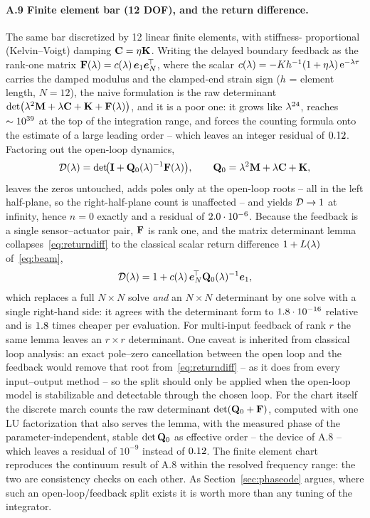 \paragraph{A.9 Finite element bar (12 DOF), and the return difference.}
The same bar discretized by 12 linear finite elements, with stiffness-
proportional (Kelvin--Voigt) damping $\mathbf{C}=\eta\mathbf{K}$. Writing the delayed
boundary feedback as the rank-one matrix
$\mathbf{F}(\lambda)=c(\lambda)\,\boldsymbol{e}_{1}\boldsymbol{e}_{N}^{\!\top}$, where the scalar
$c(\lambda)=-K h^{-1}(1+\eta\lambda)\,\mathrm{e}^{-\lambda\tau}$ carries the damped modulus
and the clamped-end strain sign ($h$ = element length, $N=12$), the naive
formulation is the raw determinant
$\det\bigl(\lambda^2\mathbf{M}+\lambda\mathbf{C}+\mathbf{K}+\mathbf{F}(\lambda)\bigr)$, and it is a
poor one: it grows like $\lambda^{24}$, reaches $\sim10^{39}$ at the top of
the integration range, and forces the counting formula onto the estimate of a
large leading order -- which leaves an integer residual of $0.12$.
Factoring out the open-loop dynamics,
\begin{equation}\label{eq:returndiff}
  \mathcal{D}(\lambda) = \det\!\bigl(\mathbf{I} + \mathbf{Q}_0(\lambda)^{-1}\mathbf{F}(\lambda)\bigr),
  \qquad \mathbf{Q}_0 = \lambda^2\mathbf{M}+\lambda\mathbf{C}+\mathbf{K},
\end{equation}
leaves the zeros untouched, adds poles only at the open-loop roots -- all in
the left half-plane, so the right-half-plane count is unaffected -- and
yields $\mathcal{D}\to1$ at infinity, hence $n=0$ exactly and a residual of
$2.0 \cdot 10^{-6}$. Because the feedback is a single sensor--actuator pair,
$\mathbf{F}$ is rank one, and the matrix determinant lemma
collapses~\eqref{eq:returndiff} to the classical scalar return difference
$1+L(\lambda)$ of~\eqref{eq:beam},
\begin{equation}\label{eq:detlemma}
  \mathcal{D}(\lambda) = 1 + c(\lambda)\,
                \boldsymbol{e}_{N}^{\!\top}\mathbf{Q}_0(\lambda)^{-1}\boldsymbol{e}_{1},
\end{equation}
which replaces a full $N\times N$ solve \emph{and} an $N\times N$
determinant by one solve with a single right-hand side: it agrees with the
determinant form to $1.8 \cdot 10^{-16}$ relative and is $1.8$ times
cheaper per evaluation. For multi-input feedback of rank $r$ the same lemma
leaves an $r\times r$ determinant. One caveat is inherited from classical
loop analysis: an exact pole--zero cancellation between the open loop and
the feedback would remove that root from~\eqref{eq:returndiff} -- as it does
from every input--output method -- so the split should only be applied when
the open-loop model is stabilizable and detectable through the chosen loop.
For the chart itself the discrete march counts the raw determinant
$\det(\mathbf{Q}_0+\mathbf{F})$, computed with one LU factorization that also serves
the lemma, with the measured phase of the parameter-independent, stable
$\det\mathbf{Q}_0$ as effective order -- the device of A.8 -- which leaves a
residual of $10^{-9}$ instead of $0.12$. The finite element chart
reproduces the continuum result of A.8 within the resolved frequency range:
the two are consistency checks on each other. As
Section~\ref{sec:phaseode} argues, where such an open-loop/feedback split
exists it is worth more than any tuning of the integrator.

